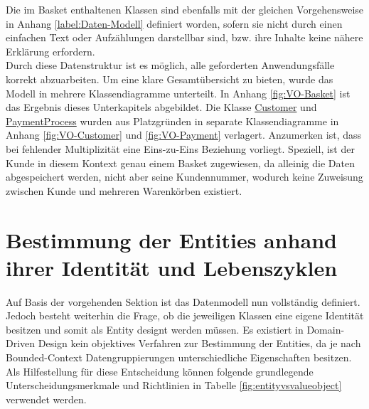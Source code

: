 
\vspace{1em}
Die im Basket enthaltenen Klassen sind ebenfalls mit der gleichen Vorgehensweise in Anhang \ref{label:Daten-Modell} definiert worden, sofern sie nicht durch einen einfachen Text oder Aufzählungen darstellbar sind, bzw. ihre Inhalte keine nähere Erklärung erfordern. \\

Durch diese Datenstruktur ist es möglich, alle geforderten Anwendungsfälle korrekt abzuarbeiten. Um eine klare Gesamtübersicht zu bieten, wurde das Modell in mehrere Klassendiagramme unterteilt. In Anhang \ref{fig:VO-Basket} ist das Ergebnis dieses Unterkapitels abgebildet. Die Klasse \ul{Customer} und \ul{PaymentProcess} wurden aus Platzgründen in separate Klassendiagramme in Anhang \ref{fig:VO-Customer} und \ref{fig:VO-Payment} verlagert. Anzumerken ist, dass bei fehlender Multiplizität eine Eins-zu-Eins Beziehung vorliegt. Speziell, ist der Kunde in diesem Kontext genau einem Basket zugewiesen, da alleinig die Daten abgespeichert werden, nicht aber seine Kundennummer, wodurch keine Zuweisung zwischen Kunde und mehreren Warenkörben existiert.

\section{Bestimmung der Entities anhand ihrer Identität und Lebenszyklen}

Auf Basis der vorgehenden Sektion ist das Datenmodell nun vollständig definiert. Jedoch besteht weiterhin die Frage, ob die jeweiligen Klassen eine eigene Identität besitzen und somit als Entity designt werden müssen. Es existiert in Domain-Driven Design kein objektives Verfahren zur Bestimmung der Entities, da je nach Bounded-Context Datengruppierungen unterschiedliche Eigenschaften besitzen. Als Hilfestellung für diese Entscheidung können folgende grundlegende Unterscheidungsmerkmale und Richtlinien in Tabelle \ref{fig:entityvsvalueobject} verwendet werden.

